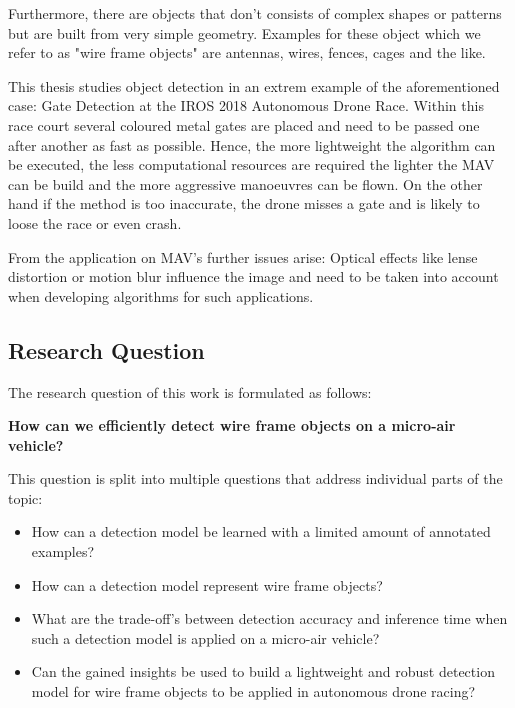 Furthermore, there are objects that don't consists of complex shapes or patterns but are built from very simple geometry. Examples for these object which we refer to as "wire frame objects" are antennas, wires, fences, cages and the like.  

This thesis studies object detection in an extrem example of the aforementioned case: Gate Detection at the IROS 2018 Autonomous Drone Race. Within this race court several coloured metal gates are placed and need to be passed one after another as fast as possible. Hence, the more lightweight the algorithm can be executed, the less computational resources are required the lighter the \ac{MAV} can be build and the more aggressive manoeuvres can be flown. On the other hand if the method is too inaccurate, the drone misses a gate and is likely to loose the race or even crash.

From the application on MAV's further issues arise: Optical effects like lense distortion or motion blur influence the image and need to be taken into account when developing algorithms for such applications. 
\subsection*{Research Question}

The research question of this work is formulated as follows:
\begin{center}
	\textbf{How can we efficiently detect wire frame objects on a micro-air vehicle?}
\end{center}


This question is split into multiple questions that address individual parts of the topic:

\begin{itemize}
	\item How can a detection model be learned with a limited amount of annotated examples?
	\item How can a detection model represent wire frame objects?
	\item What are the trade-off's between detection accuracy and inference time when such a detection model is applied on a micro-air vehicle?
	\item Can the gained insights be used to build a lightweight and robust detection model for wire frame objects to be applied in autonomous drone racing?
\end{itemize}

